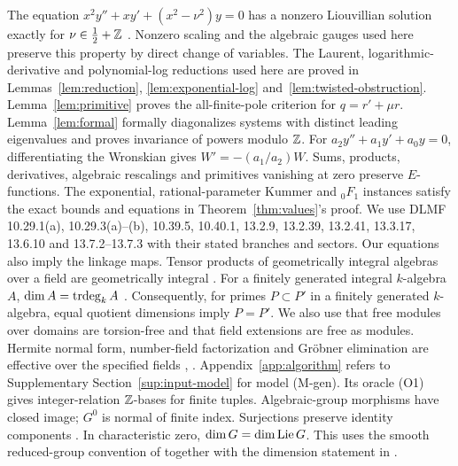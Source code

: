 The equation $x^2y''+xy'+(x^2-\nu^2)y=0$ has a nonzero
Liouvillian solution exactly for $\nu\in\tfrac12+\mathbb{Z}$
\cite[\S3.2, Example~2, p.~14; \S4.2, Example~2, pp.~19--20]{Kovacic1986}.
Nonzero scaling and the algebraic gauges used here preserve this property
by direct change of variables.
The Laurent, logarithmic-derivative and polynomial-log
reductions used here are proved in Lemmas~\ref{lem:reduction},
\ref{lem:exponential-log} and~\ref{lem:twisted-obstruction}.
Lemma~\ref{lem:primitive} proves the all-finite-pole criterion
for $q=r'+\mu r$.
Lemma~\ref{lem:formal} formally diagonalizes systems with
distinct leading eigenvalues and proves invariance of powers modulo $\mathbb{Z}$.
For $a_2y''+a_1y'+a_0y=0$, differentiating the Wronskian
gives $W'=-(a_1/a_2)W$.
Sums, products, derivatives, algebraic rescalings and
primitives vanishing at zero preserve $E$-functions. The exponential,
rational-parameter Kummer and ${}_0F_1$ instances satisfy the exact bounds
and equations in Theorem~\ref{thm:values}'s proof.
We use DLMF 10.29.1(a), 10.29.3(a)--(b), 10.39.5, 10.40.1, 13.2.9, 13.2.39,
13.2.41, 13.3.17, 13.6.10 and 13.7.2--13.7.3 with their stated branches
and sectors. Our equations also imply the linkage maps.
Tensor products of geometrically integral algebras over a
field are geometrically integral \cite[Proposition~(4.6.5)(ii), p.~69]{EGAIV2}.
For a finitely generated integral $k$-algebra $A$, $\dim A=\operatorname{trdeg}_k A$
\cite[Theorem~5.6, p.~34]{Matsumura1989}. Consequently, for primes
$P\subset P'$ in a finitely generated $k$-algebra, equal quotient
dimensions imply $P=P'$.
We also use that free modules over domains are torsion-free and that
field extensions are free as modules.
Hermite normal form, number-field factorization and
Gr\"obner elimination are effective over the specified fields
\cite[\S\S2.4,3.6]{Cohen1993}, \cite{BeckerWeispfenning1993}.
Appendix~\ref{app:algorithm} refers to Supplementary Section~\ref{sup:input-model} for model (M-gen).
Its oracle (O1) gives integer-relation $\mathbb{Z}$-bases for finite tuples.
Algebraic-group morphisms have closed image; $G^0$ is normal of finite index.
Surjections preserve identity components
\cite[Proposition~1.2(b), p.~46; Corollary~1.4(a)--(b), p.~47]{Borel1991}.
In characteristic zero, $\dim G=\dim\operatorname{Lie} G$. This uses the smooth reduced-group
convention of \cite[\S9.1, p.~65]{Humphreys1975} together with the dimension statement in
\cite[Proposition~1.2(a), p.~46]{Borel1991}.
